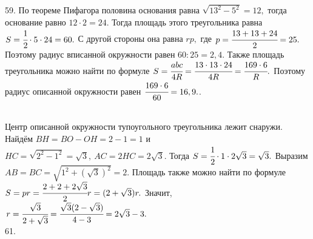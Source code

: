 \documentclass[12pt]{article}
\begin{document}
59. По теореме Пифагора половина основания равна $\sqrt{13^2-5^2}=12,$ тогда основание равно $12\cdot2=24.$ Тогда площадь этого треугольника равна $S=\cfrac{1}{2}\cdot5\cdot24=60.$ С другой стороны она равна $rp,$ где $p=\cfrac{13+13+24}{2}=25.$ Поэтому радиус вписанной окружности равен $60:25=2,4.$ Также площадь треугольника можно найти по формуле $S=\cfrac{abc}{4R}=\cfrac{13\cdot13\cdot24}{4R}=\cfrac{169\cdot6}{R}.$ Поэтому радиус описанной окружности равен $\cfrac{169\cdot6}{60}=16,9.$\newpage{}. \begin{figure}[ht!]
\end{figure}\\
Центр описанной окружности тупоугольного треугольника лежит снаружи. Найдём $BH=BO-OH=2-1=1$ и $HC=\sqrt{2^2-1^2}=\sqrt{3},\ AC=2HC=2\sqrt{3}.$ Тогда $S=\cfrac{1}{2}\cdot1\cdot2\sqrt{3}=\sqrt{3}.$ Выразим $AB=BC=\sqrt{1^2+(\sqrt{3})^2}=2.$ Площадь также можно найти по формуле $S=pr=\cfrac{2+2+2\sqrt{3}}{2}r=(2+\sqrt{3})r.$ Значит, $r=\cfrac{\sqrt{3}}{2+\sqrt{3}}=\cfrac{\sqrt{3}(2-\sqrt{3})}{4-3}=2\sqrt{3}-3.$\\
61. \begin{figure}[ht!]
\end{figure}\\
\end{document}
